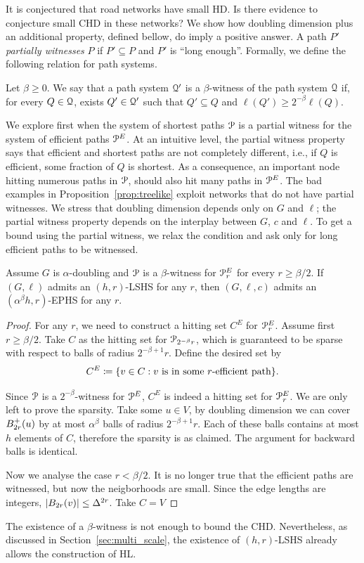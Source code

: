 It is conjectured that road networks have small HD.
Is there evidence to conjecture small CHD in these networks?
We show how doubling dimension plus an additional property, defined bellow, do imply a positive answer.
A path $P'$ \emph{partially witnesses} $P$ if $P'\subseteq P$ and $P'$ is ``long enough''.
Formally, we define the following relation for path systems.

\begin{definition}
Let $\beta\geq 0$.
We say that a path system $\mathcal{Q}'$ is a $\beta$-witness of the path system $\mathcal{Q}$ if, for every $Q\in\mathcal{Q}$, exists $Q'\in\mathcal{Q}'$ such that $Q'\subseteq Q$ and $\ell(Q')\geq 2^{-\beta}\ell(Q)$.
\end{definition}

We explore first when the system of shortest paths $\mathcal{P}$ is a partial witness for the system of efficient paths $\mathcal{P}^E$.
At an intuitive level, the partial witness property says that efficient and shortest paths are not completely different, i.e., if $Q$ is efficient, some fraction of $Q$ is shortest.
As a consequence, an important node hitting numerous paths in $\mathcal{P}$, should also hit many paths in $\mathcal{P}^E$.
The bad examples in Proposition~\ref{prop:treelike} exploit networks that do not have partial witnesses.
We stress that doubling dimension depends only on $G$ and $\ell$; the partial witness property depends on the interplay between $G$, $c$ and $\ell$.
To get a bound using the partial witness, we relax the condition and ask only for long efficient paths to be witnessed.

\begin{proposition}\label{prop:doubling}
Assume $G$ is $\alpha$-doubling and $\mathcal{P}$ is a $\beta$-witness for $\mathcal{P}^E_r$ for every $r\geq \beta/2$.
If $(G,\ell)$ admits an $(h,r)$-LSHS for any $r$, then $(G,\ell,c)$ admits an $(\alpha^{\beta} h,r)$-EPHS for any $r$.
\end{proposition}
\begin{proof}
For any $r$, we need to construct a hitting set $C^E$ for $\mathcal{P}_r^E$.
Assume first $r\geq\beta/2$.
Take $C$ as the hitting set for $\mathcal{P}_{2^{-\beta}r}$, which is guaranteed to be sparse with respect to balls of radius $2^{-\beta+1}r$.
Define the desired set by
\[
C^E\coloneqq\{v\in C: v \text{ is in some $r$-efficient path} \}.
\]

Since $\mathcal{P}$ is a $2^{-\beta}$-witness for $\mathcal{P}^E$, $C^E$ is indeed a hitting set for $\mathcal{P}^E_r$.
We are only left to prove the sparsity.
Take some $u\in V$, by doubling dimension we can cover $B^+_{2r}(u)$ by at most $\alpha^\beta$ balls of radius $2^{-\beta+1}r$.
Each of these balls contains at most $h$ elements of $C$, therefore the sparsity is as claimed.
The argument for backward balls is identical.

Now we analyse the case $r<\beta/2$.
It is no longer true that the efficient paths are witnessed, but now the neigborhoods are small.
Since the edge lengths are integers, $\lvert B_{2r}(v)\rvert\leq \Delta^{2r}$.
Take $C=V$ 
\end{proof}

\begin{remark}
The existence of a $\beta$-witness is not enough to bound the CHD.
Nevertheless, as discussed in Section~\ref{sec:multi_scale}, the existence of $(h,r)$-LSHS already allows the construction of HL.
\end{remark}
